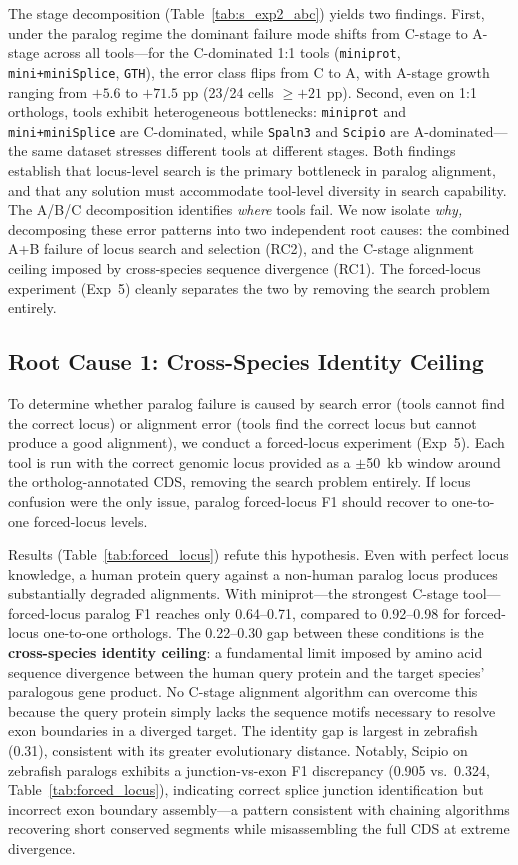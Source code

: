 The stage decomposition (Table~\ref{tab:s_exp2_abc}) yields two findings. First, under the paralog regime the dominant failure mode shifts from C-stage to A-stage across all tools---for the C-dominated 1:1 tools (\texttt{miniprot}, \texttt{mini+miniSplice}, \texttt{GTH}), the error class flips from C to A, with A-stage growth ranging from $+5.6$ to $+71.5$ pp (23/24 cells $\ge +21$ pp). Second, even on 1:1 orthologs, tools exhibit heterogeneous bottlenecks: \texttt{miniprot} and \texttt{mini+miniSplice} are C-dominated, while \texttt{Spaln3} and \texttt{Scipio} are A-dominated---the same dataset stresses different tools at different stages. Both findings establish that locus-level search is the primary bottleneck in paralog alignment, and that any solution must accommodate tool-level diversity in search capability. The A/B/C decomposition identifies \emph{where} tools fail. We now isolate \emph{why,} decomposing these error patterns into two independent root causes: the combined A+B failure of locus search and selection (RC2), and the C-stage alignment ceiling imposed by cross-species sequence divergence (RC1). The forced-locus experiment (Exp~5) cleanly separates the two by removing the search problem entirely.

\subsection{Root Cause 1: Cross-Species Identity Ceiling}

To determine whether paralog failure is caused by search error (tools cannot find the correct locus) or alignment error (tools find the correct locus but cannot produce a good alignment), we conduct a forced-locus experiment (Exp~5). Each tool is run with the correct genomic locus provided as a $\pm$50~kb window around the ortholog-annotated CDS, removing the search problem entirely. If locus confusion were the only issue, paralog forced-locus F1 should recover to one-to-one forced-locus levels.

Results (Table~\ref{tab:forced_locus}) refute this hypothesis. Even with perfect locus knowledge, a human protein query against a non-human paralog locus produces substantially degraded alignments. With miniprot---the strongest C-stage tool---forced-locus paralog F1 reaches only 0.64--0.71, compared to 0.92--0.98 for forced-locus one-to-one orthologs. The 0.22--0.30 gap between these conditions is the \textbf{cross-species identity ceiling}: a fundamental limit imposed by amino acid sequence divergence between the human query protein and the target species' paralogous gene product. No C-stage alignment algorithm can overcome this because the query protein simply lacks the sequence motifs necessary to resolve exon boundaries in a diverged target. The identity gap is largest in zebrafish (0.31), consistent with its greater evolutionary distance. Notably, Scipio on zebrafish paralogs exhibits a junction-vs-exon F1 discrepancy (0.905 vs.\ 0.324, Table~\ref{tab:forced_locus}), indicating correct splice junction identification but incorrect exon boundary assembly---a pattern consistent with chaining algorithms recovering short conserved segments while misassembling the full CDS at extreme divergence.

